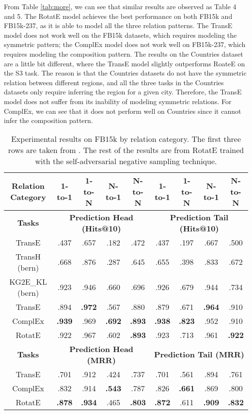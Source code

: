 \documentclass{article} \usepackage{iclr2019_conference,times}
\begin{document}
From Table \ref{tab:more}, we can see that similar results are observed as Table 4 and 5. The RotatE model achieves the best performance on both FB15k and FB15k-237, as it is able to model all the three relation patterns. The TransE model does not work well on the FB15k datasets, which requires modeling the symmetric pattern; the ComplEx model does not work well on FB15k-237, which requires modeling the composition pattern. The results on the Countries dataset are a little bit different, where the TransE model slightly outperforms RoateE on the S3 task. The reason is that the Countries datasets do not have the symmetric relation between different regions, and all the three tasks in the Countries datasets only require inferring the region for a given city. Therefore, the TransE model does not suffer from its inability of modeling symmetric relations. For ComplEx, we can see that it does not perform well on Countries since it cannot infer the composition pattern.

\begin{table}[t]
\centering
\small
\begin{tabular}{|c|c|c|c|c|c|c|c|c|}
\hline
Relation Category & 1-to-1 & 1-to-N & N-to-1 & N-to-N & 1-to-1 & 1-to-N & N-to-1 & N-to-N\\
\hline
\textbf{Tasks} & \multicolumn{4}{c|}{\textbf{Prediction Head (Hits@10)}} & \multicolumn{4}{c|}{\textbf{Prediction Tail (Hits@10)}}\\
\hline
TransE  & .437 & .657 & .182 & .472 & .437 & .197 & .667 & .500\\
\hline
TransH (bern)  & .668 & .876 & .287 & .645 & .655 & .398 & .833 & .672\\
\hline
KG2E\_KL (bern) & .923 & .946 & .660 & .696 & .926 & .679 & .944 & .734\\
\hline
\hline
TransE & .894 & \textbf{.972} & .567 & .880 & .879 & .671 & \textbf{.964} & .910\\
\hline
ComplEx & \textbf{.939} & .969 & \textbf{.692} & \textbf{.893} & \textbf{.938} & \textbf{.823} & .952 & .910\\
\hline
RotatE & .922 & .967 & .602 & \textbf{.893} & .923 & .713 & .961 & \textbf{.922}\\
\hline
\hline
\textbf{Tasks} & \multicolumn{4}{c|}{\textbf{Prediction Head (MRR)}} & \multicolumn{4}{c|}{\textbf{Prediction Tail (MRR)}}\\
\hline
TransE & .701 & .912 & .424 & .737 & .701 & .561 & .894 & .761\\
\hline
ComplEx & .832 & .914 & \textbf{.543} & .787 & .826 & \textbf{.661} & .869 & .800\\
\hline
RotatE & \textbf{.878} & \textbf{.934} & .465 & \textbf{.803} & \textbf{.872} & .611 & \textbf{.909} & \textbf{.832}\\
\hline
\end{tabular}
\caption{Experimental results on FB15k by relation category. The first three rows are taken from \citep{he2015learning}. The rest of the results are from RotatE trained with the self-adversarial negative sampling technique.}
\label{tab:one2one}
\end{table}
\end{document}
